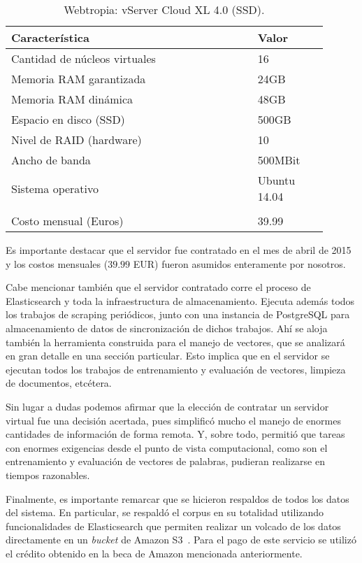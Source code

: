 \begin{table*}[t]
    \centering
    \begin{tabular}{p{0.70\linewidth}p{0.20\linewidth}}
        \hline
        Característica & Valor\\
        \hline
        Cantidad de núcleos virtuales & 16\\
        Memoria RAM garantizada & 24GB\\
        Memoria RAM dinámica & 48GB\\
        Espacio en disco (SSD) & 500GB\\
        Nivel de RAID (hardware) & 10\\
        Ancho de banda & 500MBit\\
        Sistema operativo & Ubuntu 14.04\\
        \\
        Costo mensual (Euros) & 39.99\\
        \hline
    \end{tabular}
    \caption{Webtropia: vServer Cloud XL 4.0 (SSD).}
    \label{table:webtropia}
\end{table*}

Es importante destacar que el servidor fue contratado en el mes de abril de 2015 y los costos mensuales
($39.99$ EUR) fueron asumidos enteramente por nosotros.

Cabe mencionar también que el servidor contratado corre el proceso de Elasticsearch y toda la
infraestructura de almacenamiento. Ejecuta además todos los trabajos de scraping periódicos, junto con
una instancia de PostgreSQL para almacenamiento de datos de sincronización de dichos trabajos. Ahí se
aloja también la herramienta construida para el manejo de vectores, que se analizará en gran detalle en
una sección particular. Esto implica que en el servidor se ejecutan todos los trabajos de entrenamiento y
evaluación de vectores, limpieza de documentos, etcétera.

Sin lugar a dudas podemos afirmar que la elección de contratar un servidor virtual fue una decisión
acertada, pues simplificó mucho el manejo de enormes cantidades de información de forma remota. Y, sobre
todo, permitió que tareas con enormes exigencias desde el punto de vista computacional, como son el
entrenamiento y evaluación de vectores de palabras, pudieran realizarse en tiempos razonables.

Finalmente, es importante remarcar que se hicieron respaldos de todos los datos del sistema. En particular,
se respaldó el corpus en su totalidad utilizando funcionalidades de Elasticsearch que permiten realizar
un volcado de los datos directamente en un \textit{bucket} de Amazon S3~\cite{AmazonS3}. Para el pago de
este servicio se utilizó el crédito obtenido en la beca de Amazon mencionada anteriormente.

